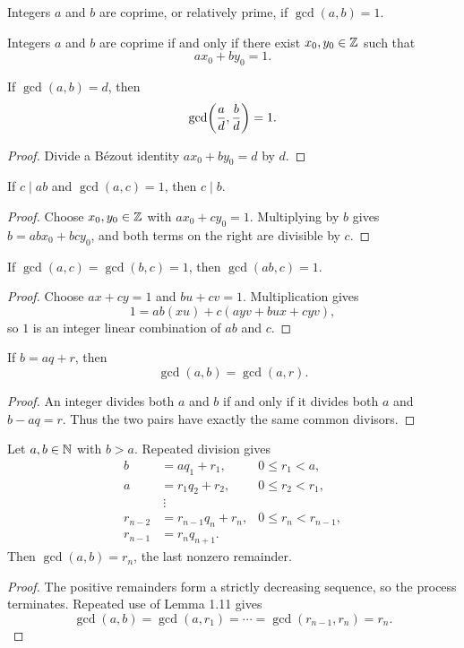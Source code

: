 \begin{de}
Integers $a$ and $b$ are coprime, or relatively prime, if $\gcd(a,b)=1$.
\end{de}

\begin{cor}
Integers $a$ and $b$ are coprime if and only if there exist $x_0,y_0\in\mathbb{Z}$ such that
\[
 ax_0+by_0=1.
\]
\end{cor}

\begin{thm}
If $\gcd(a,b)=d$, then
\[
 \gcd\paren*{\frac ad,\frac bd}=1.
\]
\end{thm}
\begin{proof}
Divide a B\'ezout identity $ax_0+by_0=d$ by $d$.
\end{proof}

\begin{thm}
If $c\mid ab$ and $\gcd(a,c)=1$, then $c\mid b$.
\end{thm}
\begin{proof}
Choose $x_0,y_0\in\mathbb{Z}$ with $ax_0+cy_0=1$.  Multiplying by $b$ gives
$b=abx_0+bcy_0$, and both terms on the right are divisible by $c$.
\end{proof}

\begin{thm}
If $\gcd(a,c)=\gcd(b,c)=1$, then $\gcd(ab,c)=1$.
\end{thm}
\begin{proof}
Choose $ax+cy=1$ and $bu+cv=1$.  Multiplication gives
\[
 1=ab(xu)+c(ayv+bux+cyv),
\]
so $1$ is an integer linear combination of $ab$ and $c$.
\end{proof}

\begin{lem}
If $b=aq+r$, then
\[
 \gcd(a,b)=\gcd(a,r).
\]
\end{lem}
\begin{proof}
An integer divides both $a$ and $b$ if and only if it divides both $a$ and $b-aq=r$.  Thus the two pairs have exactly the same common divisors.
\end{proof}

\begin{thm}
Let $a,b\in\mathbb{N}$ with $b>a$.  Repeated division gives
\begin{align*}
 b&=aq_1+r_1, &0\le r_1<a,\\
 a&=r_1q_2+r_2, &0\le r_2<r_1,\\
 &\ \vdots\\
 r_{n-2}&=r_{n-1}q_n+r_n, &0\le r_n<r_{n-1},\\
 r_{n-1}&=r_nq_{n+1}.
\end{align*}
Then $\gcd(a,b)=r_n$, the last nonzero remainder.
\end{thm}
\begin{proof}
The positive remainders form a strictly decreasing sequence, so the process terminates.  Repeated use of Lemma 1.11 gives
\[
 \gcd(a,b)=\gcd(a,r_1)=\cdots=\gcd(r_{n-1},r_n)=r_n.
\]
\end{proof}

